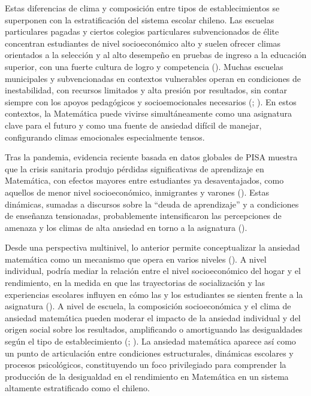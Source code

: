 \documentclass[
  spanish,
  a4paper,
  oneside]{scrbook}
\begin{document}
Estas diferencias de clima y composición entre tipos de establecimientos
se superponen con la estratificación del sistema escolar chileno. Las
escuelas particulares pagadas y ciertos colegios particulares
subvencionados de élite concentran estudiantes de nivel socioeconómico
alto y suelen ofrecer climas orientados a la selección y al alto
desempeño en pruebas de ingreso a la educación superior, con una fuerte
cultura de logro y competencia
(). Muchas
escuelas municipales y subvencionadas en contextos vulnerables operan en
condiciones de inestabilidad, con recursos limitados y alta presión por
resultados, sin contar siempre con los apoyos pedagógicos y
socioemocionales necesarios (; ). En estos contextos, la Matemática puede vivirse simultáneamente
como una asignatura clave para el futuro y como una fuente de ansiedad
difícil de manejar, configurando climas emocionales especialmente
tensos.

Tras la pandemia, evidencia reciente basada en datos globales de PISA
muestra que la crisis sanitaria produjo pérdidas significativas de
aprendizaje en Matemática, con efectos mayores entre estudiantes ya
desaventajados, como aquellos de menor nivel socioeconómico, inmigrantes
y varones ().
Estas dinámicas, sumadas a discursos sobre la ``deuda de aprendizaje'' y
a condiciones de enseñanza tensionadas, probablemente intensificaron las
percepciones de amenaza y los climas de alta ansiedad en torno a la
asignatura ().

Desde una perspectiva multinivel, lo anterior permite conceptualizar la
ansiedad matemática como un mecanismo que opera en varios niveles
(). A nivel individual, podría
mediar la relación entre el nivel socioeconómico del hogar y el
rendimiento, en la medida en que las trayectorias de socialización y las
experiencias escolares influyen en cómo las y los estudiantes se sienten
frente a la asignatura (). A nivel de escuela, la composición socioeconómica y el clima de
ansiedad matemática pueden moderar el impacto de la ansiedad individual
y del origen social sobre los resultados, amplificando o amortiguando
las desigualdades según el tipo de establecimiento
(;
). La ansiedad matemática
aparece así como un punto de articulación entre condiciones
estructurales, dinámicas escolares y procesos psicológicos,
constituyendo un foco privilegiado para comprender la producción de la
desigualdad en el rendimiento en Matemática en un sistema altamente
estratificado como el chileno.
\end{document}
